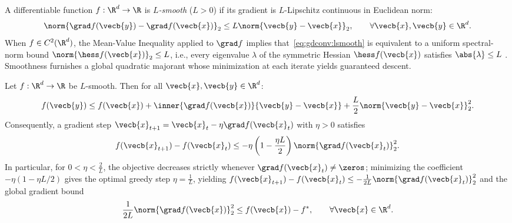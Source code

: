 \documentclass[../../../../master.tex]{subfiles}
\begin{document}
A differentiable function $f : \R^d \to \R$ is \emph{$L$-smooth} ($L > 0$) if its gradient is $L$-Lipschitz continuous in Euclidean norm:
\begin{equation}
\label{eq:gdconv:lsmooth}
  \norm{\grad f(\vecb{y}) - \grad f(\vecb{x})}_2 \le L \norm{\vecb{y} - \vecb{x}}_2, \qquad \forall \vecb{x}, \vecb{y} \in \R^d.
\end{equation}
When $f \in C^2(\R^d)$, the Mean-Value Inequality applied to $\grad f$ implies that~\eqref{eq:gdconv:lsmooth} is equivalent to a uniform spectral-norm bound $\norm{\hess f(\vecb{x})}_2 \le L$, i.e., every eigenvalue $\lambda$ of the symmetric Hessian $\hess f(\vecb{x})$ satisfies $\abs{\lambda} \le L$  . Smoothness furnishes a global quadratic majorant whose minimization at each iterate yields guaranteed descent.

\begin{coremath}
\label{thm:gdconv:descent}
Let $f : \R^d \to \R$ be $L$-smooth. Then for all $\vecb{x}, \vecb{y} \in \R^d$:
\begin{equation}
\label{eq:gdconv:quad_upper}
  f(\vecb{y}) \le f(\vecb{x}) + \inner{\grad f(\vecb{x})}{\vecb{y} - \vecb{x}} + \frac{L}{2}\norm{\vecb{y} - \vecb{x}}_2^2.
\end{equation}
Consequently, a gradient step $\vecb{x}_{t+1} = \vecb{x}_t - \eta \grad f(\vecb{x}_t)$ with $\eta > 0$ satisfies
\begin{equation}
\label{eq:gdconv:sufficient_decrease}
  f(\vecb{x}_{t+1}) - f(\vecb{x}_t) \le -\eta\left(1 - \frac{\eta L}{2}\right)\norm{\grad f(\vecb{x}_t)}_2^2.
\end{equation}
In particular, for $0 < \eta < \frac{2}{L}$, the objective decreases strictly whenever $\grad f(\vecb{x}_t) \neq \zeros$; minimizing the coefficient $-\eta(1 - \eta L/2)$ gives the optimal greedy step $\eta = \frac{1}{L}$, yielding $f(\vecb{x}_{t+1}) - f(\vecb{x}_t) \le -\frac{1}{2L}\norm{\grad f(\vecb{x}_t)}_2^2$ and the global gradient bound
\begin{equation}
\label{eq:gdconv:grad_upper}
  \frac{1}{2L}\norm{\grad f(\vecb{x})}_2^2 \le f(\vecb{x}) - f^*, \qquad \forall \vecb{x} \in \R^d.
\end{equation}
\end{coremath}
\end{document}
